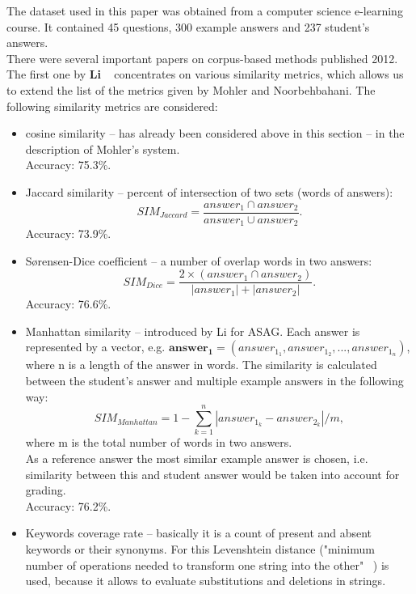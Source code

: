 The dataset used in this paper was obtained from a computer science e-learning course. It contained 45 questions, 300 example answers and 237 student's answers.\\

There were several important papers on corpus-based methods published 2012. The first one by \textbf{Li} ~\cite{Li} concentrates on various similarity metrics, which allows us to extend the list of the metrics given by Mohler and Noorbehbahani. The following similarity metrics are considered:

\begin{itemize}
\item cosine similarity -- has already been considered above in this section -- in the description of Mohler's system. \\
Accuracy: 75.3\%.
\item Jaccard similarity -- percent of intersection of two sets (words of answers):
\begin{equation} \label{eq:Jaccard}
SIM_{Jaccard} = \frac{answer_1 \cap answer_2}{answer_1 \cup answer_2}.
\end{equation}
Accuracy: 73.9\%.
\item S{\o}rensen-Dice coefficient -- a number of overlap words in two answers:
\begin{equation} \label{eq:Dice}
SIM_{Dice} = \frac{2 \times (answer_1 \cap answer_2)}{|answer_1| + |answer_2|}.
\end{equation}
Accuracy: 76.6\%.
\item Manhattan similarity -- introduced by Li for ASAG. Each answer is represented by a vector, e.g. $ \pmb{answer_1} = (answer_{1_1}, answer_{1_2},..., answer_{1_n})$, where n is a length of the answer in words. The similarity is calculated between the student's answer and multiple example answers in the following way:
\begin{equation} \label{eq:Manhattan}
SIM_{Manhattan} = 1 - \sum^n_{k=1}|answer_{1_k} - answer_{2_k}| / m,
\end{equation}
where m is the total number of words in two answers.\\
As a reference answer the most similar example answer is chosen, i.e. similarity between this and student answer would be taken into account for grading.\\
Accuracy: 76.2\%.
\item Keywords coverage rate -- basically it is a count of present and absent keywords or their synonyms. For this Levenshtein distance ("minimum number of operations needed to transform one string into the other" ~\cite{Gomaa}) is used, because it allows to evaluate substitutions and deletions in strings. \\


\end{itemize}

